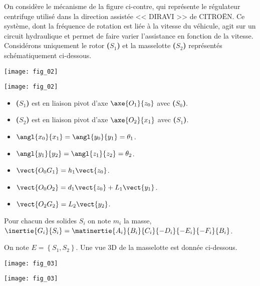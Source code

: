 \def\columnseprulecolor{\color{ocre}}
\setlength{\columnseprule}{0.4pt} 


\setcounter{exo}{0}


\ifprof
\else
\begin{multicols}{2}
\fi



On considère le mécanisme de la figure ci-contre, qui représente le régulateur centrifuge utilisé dans la direction assistée << DIRAVI >> de CITROËN. Ce système, dont la fréquence de rotation est liée à la vitesse du véhicule, agit sur un circuit hydraulique et permet de faire varier l’assistance en fonction de la vitesse.
Considérons uniquement le rotor \textbf{($S_1$)} et la masselotte \textbf{($S_2$)} représentés schématiquement ci-dessous.

\ifprof
\begin{center}
\texttt{[image: fig\_02]}
\end{center}
\else
\begin{center}
\texttt{[image: fig\_02]}
\end{center}
\fi

\begin{itemize}
\item \textbf{($S_1$)} est en liaison pivot d'axe $\axe{O_1}{z_0}$ avec \textbf{($S_0$)}.
\item \textbf{($S_2$)} est en liaison pivot d'axe $\axe{O_2}{x_1}$ avec \textbf{($S_1$)}.
\item $\angl{x_0}{x_1} = \angl{y_0}{y_1}=\theta_1$.
\item $\angl{y_1}{y_2} = \angl{z_1}{z_2}=\theta_2$.
\item $\vect{O_0G_1}=h_1\vect{z_0}$.
\item $\vect{O_0O_2}=d_1\vect{z_0}+L_1\vect{y_1}$.
\item $\vect{O_2G_2}=L_2\vect{y_2}$.
\end{itemize}
Pour chacun des solides $S_i$ on note $m_i$ la masse, $\inertie{G_i}{S_i}=\matinertie{A_i}{B_i}{C_i}{-D_i}{-E_i}{-F_i}{B_i}$.

On note $E=\left\{ S_1,S_2\right\}$. 
Une vue 3D de la masselotte est donnée ci-dessous. 

\ifprof
\begin{center}
\texttt{[image: fig\_03]}
\end{center}
\else
\begin{center}
\texttt{[image: fig\_03]}
\end{center}
\fi


\end{multicols}
